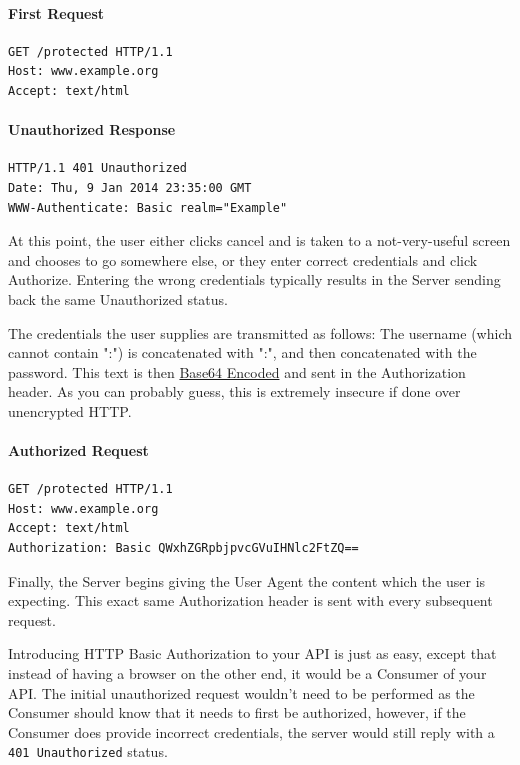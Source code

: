 \documentclass{book}
\begin{document}
\paragraph{\textbf{First Request}}

\begin{verbatim}
GET /protected HTTP/1.1
Host: www.example.org
Accept: text/html
\end{verbatim}

\paragraph{\textbf{Unauthorized Response}}

\begin{verbatim}
HTTP/1.1 401 Unauthorized
Date: Thu, 9 Jan 2014 23:35:00 GMT
WWW-Authenticate: Basic realm="Example"
\end{verbatim}

At this point, the user either clicks cancel and is taken to a not-very-useful screen and chooses to go somewhere else, or they enter correct credentials and click Authorize. Entering the wrong credentials typically results in the Server sending back the same Unauthorized status.

The credentials the user supplies are transmitted as follows: The username (which cannot contain ":") is concatenated with ":", and then concatenated with the password. This text is then \href{https://en.wikipedia.org/wiki/Base64}{Base64 Encoded} and sent in the Authorization header. As you can probably guess, this is extremely insecure if done over unencrypted HTTP.

\paragraph{\textbf{Authorized Request}}

\begin{verbatim}
GET /protected HTTP/1.1
Host: www.example.org
Accept: text/html
Authorization: Basic QWxhZGRpbjpvcGVuIHNlc2FtZQ==
\end{verbatim}

Finally, the Server begins giving the User Agent the content which the user is expecting. This exact same Authorization header is sent with every subsequent request.

Introducing HTTP Basic Authorization to your API is just as easy, except that instead of having a browser on the other end, it would be a Consumer of your API. The initial unauthorized request wouldn't need to be performed as the Consumer should know that it needs to first be authorized, however, if the Consumer does provide incorrect credentials, the server would still reply with a \texttt{401 Unauthorized} status.
\end{document}
